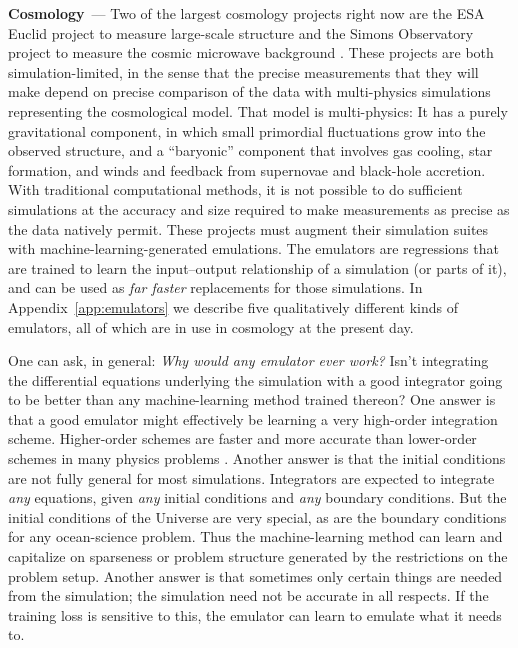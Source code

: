 \documentclass[10pt]{article}
\renewcommand{\paragraph}[1]{\smallskip\par\noindent\textbf{#1}~---}
\begin{document}
\paragraph{Cosmology}
Two of the largest cosmology projects right now are the ESA Euclid project to measure large-scale structure \cite{euclid} and the Simons Observatory project to measure the cosmic microwave background \cite{simonsobservatory}.
These projects are both simulation-limited, in the sense that the precise measurements that they will make depend on precise comparison of the data with multi-physics simulations representing the cosmological model.
That model is multi-physics: It has a purely gravitational component, in which small primordial fluctuations grow into the observed structure, and a ``baryonic'' component that involves gas cooling, star formation, and winds and feedback from supernovae and black-hole accretion.
With traditional computational methods, it is not possible to do sufficient simulations at the accuracy and size required to make measurements as precise as the data natively permit.
These projects must augment their simulation suites with ma\-chine-learn\-ing-gen\-er\-a\-ted emulations.
The emulators are regressions that are trained to learn the input--output relationship of a simulation (or parts of it), and can be used as \emph{far faster} replacements for those simulations.
In Appendix~\ref{app:emulators} we describe five qualitatively different kinds of emulators, all of which are in use in cosmology at the present day.

One can ask, in general: \emph{Why would any emulator ever work?}
Isn't integrating the differential equations underlying the simulation with a good integrator going to be better than any machine-learning method trained thereon?
One answer is that a good emulator might effectively be learning a very high-order integration scheme.
Higher-order schemes are faster and more accurate than lower-order schemes in many physics problems \cite{highorder}.
Another answer is that the initial conditions are not fully general for most simulations.
Integrators are expected to integrate \emph{any} equations, given \emph{any} initial conditions and \emph{any} boundary conditions.
But the initial conditions of the Universe are very special, as are the boundary conditions for any ocean-science problem.
Thus the machine-learning method can learn and capitalize on sparseness or problem structure generated by the restrictions on the problem setup.
Another answer is that sometimes only certain things are needed from the simulation; the simulation need not be accurate in all respects.
If the training loss is sensitive to this, the emulator can learn to emulate what it needs to.
\end{document}
